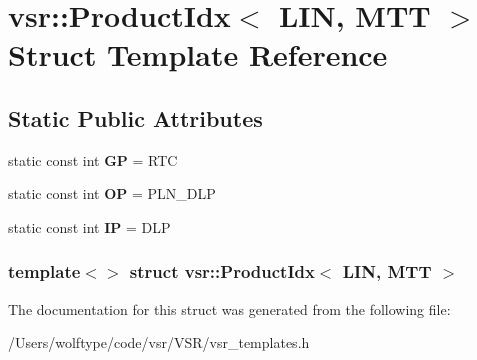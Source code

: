 \hypertarget{structvsr_1_1_product_idx_3_01_l_i_n_00_01_m_t_t_01_4}{\section{vsr\-:\-:Product\-Idx$<$ L\-I\-N, M\-T\-T $>$ Struct Template Reference}
\label{structvsr_1_1_product_idx_3_01_l_i_n_00_01_m_t_t_01_4}
}
\subsection*{Static Public Attributes}
\begin{DoxyCompactItemize}
\item 
\hypertarget{structvsr_1_1_product_idx_3_01_l_i_n_00_01_m_t_t_01_4_aecfb8cac7324cda5841d5404367194af}{static const int {\bfseries G\-P} = R\-T\-C}\label{structvsr_1_1_product_idx_3_01_l_i_n_00_01_m_t_t_01_4_aecfb8cac7324cda5841d5404367194af}

\item 
\hypertarget{structvsr_1_1_product_idx_3_01_l_i_n_00_01_m_t_t_01_4_ab0b16eb29df89f3173501ad3fc215370}{static const int {\bfseries O\-P} = P\-L\-N\-\_\-\-D\-L\-P}\label{structvsr_1_1_product_idx_3_01_l_i_n_00_01_m_t_t_01_4_ab0b16eb29df89f3173501ad3fc215370}

\item 
\hypertarget{structvsr_1_1_product_idx_3_01_l_i_n_00_01_m_t_t_01_4_aa334629f46bf5a231ac3a408c8c29e35}{static const int {\bfseries I\-P} = D\-L\-P}\label{structvsr_1_1_product_idx_3_01_l_i_n_00_01_m_t_t_01_4_aa334629f46bf5a231ac3a408c8c29e35}

\end{DoxyCompactItemize}
\subsubsection*{template$<$$>$ struct vsr\-::\-Product\-Idx$<$ L\-I\-N, M\-T\-T $>$}



The documentation for this struct was generated from the following file\-:\begin{DoxyCompactItemize}
\item 
/\-Users/wolftype/code/vsr/\-V\-S\-R/vsr\-\_\-templates.\-h\end{DoxyCompactItemize}
